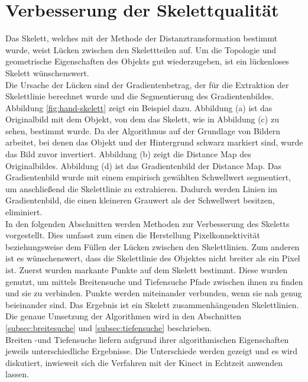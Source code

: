 \section{Verbesserung der Skelettqualität}
Das Skelett, welches mit der Methode der Distanztransformation bestimmt wurde, weist Lücken zwischen den Skelettteilen auf. Um die Topologie und geometrische Eigenschaften des Objekts gut wiederzugeben, ist ein lückenloses Skelett wünschenswert. \\
Die Ursache der Lücken sind der Gradientenbetrag, der für die Extraktion der Skelettlinie berechnet wurde und die Segmentierung des Gradientenbildes. Abbildung \ref{fig:hand-skelett} zeigt ein Beispiel dazu. Abbildung (a) ist das Originalbild mit dem Objekt, von dem das Skelett, wie in Abbildung (c) zu sehen, bestimmt wurde. Da der Algorithmus auf der Grundlage von Bildern arbeitet, bei denen das Objekt und der Hintergrund schwarz markiert sind,
wurde das Bild zuvor invertiert. Abbildung (b) zeigt die Distance Map des Originalbildes. Abbildung (d) ist das Gradientenbild der Distance Map. Das Gradientenbild wurde mit einem empirisch gewählten Schwellwert segmentiert, um anschließend die Skelettlinie zu extrahieren. Dadurch werden Linien im Gradientenbild, die einen kleineren Grauwert als der Schwellwert besitzen, eliminiert. \\
In den folgenden Abschnitten werden Methoden zur Verbesserung des Skeletts vorgestellt. Dies umfasst zum einen die Herstellung Pixelkonnektivität beziehungsweise dem Füllen der Lücken zwischen den Skelettlinien. Zum anderen ist es wünschenswert, dass die Skelettlinie des Objektes nicht breiter als ein Pixel ist. Zuerst wurden markante Punkte auf dem Skelett bestimmt. Diese wurden
genutzt, um mittels Breitensuche und Tiefensuche Pfade zwischen ihnen zu finden und sie zu verbinden. Punkte werden miteinander
verbunden, wenn sie nah genug beieinander sind. Das Ergebnis ist ein Skelett
zusammenhängenden Skelettlinien. Die genaue Umsetzung der Algorithmen wird in den Abschnitten \ref{subsec:breitesuche} und \ref{subsec:tiefensuche} beschrieben.\\
Breiten -und Tiefensuche liefern aufgrund ihrer algorithmischen Eigenschaften jeweils unterschiedliche Ergebnisse. Die Unterschiede werden gezeigt und es wird diskutiert, inwieweit sich die Verfahren mit der Kinect in Echtzeit anwenden lassen. 
